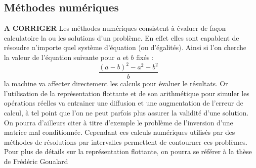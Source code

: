 \subsection{Méthodes numériques}
 \textbf{A CORRIGER}
Les méthodes numériques consistent à évaluer de façon calculatoire la ou les solutions d'un problème. En effet elles sont capablent de résoudre n'importe quel système d'équation (ou d'égalités). Ainsi si l'on cherche la valeur de l'équation suivante pour $a$ et $b$ fixés : 
\begin{equation}\label{eq} \frac{{(a-b)}^{2}-a^2-b^2}{b}\end{equation}                                             
la machine va affecter directement les calculs pour évaluer le résultats. Or l'utilisation de la représentation flottante et de son arithmétique pour simuler les opérations réelles va entrainer une diffusion et une augmentation de l'erreur de calcul, à tel point que l'on ne peut  parfois plus assurer la validité d'une solution. On pourra d'ailleurs citer à titre d'exemple le problème de l'inversion d'une matrice mal conditionnée. Cependant ces calculs numériques utilisés  par des méthodes de résolutions par intervalles permettent de contourner ces problèmes. Pour plus de détails sur la représentation flottante, on pourra se référer à la thèse de Frédéric Goualard \cite{Goualard}

